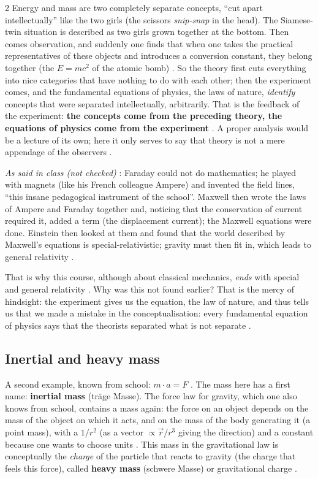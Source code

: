 \begin{paracol}{2}
Energy and mass are two completely separate concepts, ``cut apart intellectually'' like the two girls (the scissors
\emph{snip-snap} in the head). The Siamese-twin situation is described as two girls grown together at the bottom.
Then comes observation, and suddenly one finds that when one takes the practical representatives of these objects and
introduces a conversion constant, they belong together (the $E=mc^2$ of the atomic bomb) .
So the theory first cuts everything into nice categories that have nothing to do with each other; then the experiment
comes, and the fundamental equations of physics, the laws of nature, \emph{identify} concepts that were separated
intellectually, arbitrarily. That is the feedback of the experiment: \textbf{the concepts come from the preceding
theory, the equations of physics come from the experiment} .
A proper analysis would be a lecture of its own; here it only serves to say that theory is not a mere appendage of
the observers .

\begin{history}
\emph{As said in class (not checked)} : Faraday could not do mathematics; he played with magnets (like his French
colleague Ampere) and invented the field lines, ``this insane pedagogical instrument of the school''. Maxwell then
wrote the laws of Ampere and Faraday together and, noticing that the conservation of current required it, added a
term (the displacement current); the Maxwell equations were done. Einstein then looked at them and found that the
world described by Maxwell's equations is special-relativistic; gravity must then fit in, which leads to general
relativity .\end{history}

That is why this course, although about classical mechanics, \emph{ends} with special and general relativity
. Why was this not found earlier? That is the mercy of hindsight: the experiment
gives us the equation, the law of nature, and thus tells us that we made a mistake in the conceptualisation: every
fundamental equation of physics says that the theorists separated what is not separate .

\subsection{Inertial and heavy mass}\label{ssec:bv-mass}

A second example, known from school: $m\cdot a=F$ . The mass here has a first name:
\textbf{inertial mass} (träge Masse). The force law for gravity, which one also knows from school, contains a mass
again: the force on an object depends on the mass of the object on which it acts, and on the mass of the body
generating it (a point mass), with a $1/r^2$ (as a vector $\propto \vec r/r^3$ giving the direction) and a constant
because one wants to choose units . This mass in the
gravitational law is conceptually the \emph{charge} of the particle that reacts to gravity (the charge that feels this
force), called \textbf{heavy mass} (schwere Masse) or gravitational charge .


\end{paracol}
